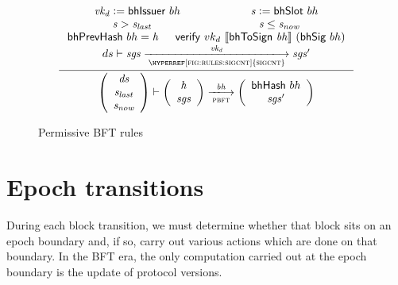 \documentclass[11pt,a4paper]{article}
\newcommand{\var}[1]{\mathit{#1}}
\newcommand{\fun}[1]{\mathsf{#1}}
\newcommand{\type}[1]{\mathsf{#1}}
\newcommand{\trans}[2]{\xlongrightarrow[\textsc{#1}]{#2}}
\newcommand{\serialised}[1]{\llbracket \var{#1} \rrbracket}
\newcommand{\leteq}{\ensuremath{\mathrel{\mathop:}=}}
\newcommand{\verifyname}{verify}
\newcommand{\bhsigname}{bhSig}
\newcommand{\bhissuername}{bhIssuer}
\newcommand{\verify}[3]{\fun{\verifyname} ~ #1 ~ #2 ~ #3}
\newcommand{\bhsig}[1]{\fun{\bhsigname} ~ #1}
\newcommand{\bhissuer}[1]{\fun{\bhissuername} ~ #1}
\begin{document}
\begin{figure}[ht]
  \begin{equation*}
    \inference
    {
      \var{vk_d} \leteq \bhissuer{bh} & \var{s} \leteq \bhslot{bh}
      \\ \var{s} > \var{s_{last}} & \var{s} \leq \var{s_{now}}
      \\ \bhprevhash{bh} = \var{h} & \verify{vk_d}{\serialised{\bhtosign{bh}}}{(\bhsig{bh})}
      \\
      ds
      \vdash
      \var{sgs} \trans{\hyperref[fig:rules:sigcnt]{sigcnt}}{\var{vk_d}} \var{sgs'}
      \\
    }
    {
      \left(
        {\begin{array}{c}
           \var{ds} \\
           \var{s_{last}} \\
           \var{s_{now}} \\
         \end{array}}
     \right)
     \vdash
     \left(
       {\begin{array}{c}
          \var{h} \\
          \var{sgs}
        \end{array}}
    \right)
    \trans{pbft}{\var{bh}}
    \left(
      {\begin{array}{c}
         \bhhash{bh} \\
         \var{sgs}'
       \end{array}}
   \right)
 }
\end{equation*}
\caption{Permissive BFT rules}
\label{fig:rules:pbft}
\end{figure}


\clearpage

\section{Epoch transitions}

\newcommand{\Epoch}{\type{Epoch}}

\newcommand{\ETState}{\type{ETState}}
\newcommand{\ETEnv}{\type{ETEnv}}

\newcommand{\sepochname}{sEpoch}
\newcommand{\sepoch}[2]{\fun{\sepochname}\ #1\ #2}

During each block transition, we must determine whether that block sits on an
epoch boundary and, if so, carry out various actions which are done on that
boundary. In the BFT era, the only computation carried out at the epoch boundary
is the update of protocol versions.
\end{document}
